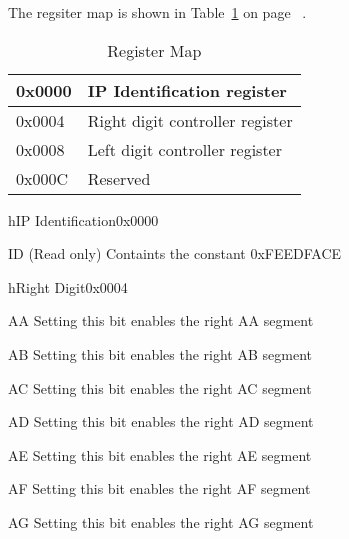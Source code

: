 \documentclass{report}
\begin{document}
The regsiter map is shown in
Table~\ref{table:bar0regmap} on page
~\pageref{table:bar0regmap}.  

\begin{table}[h]
\begin{tabular}{||l|l||}
\hline
 0x0000 & IP Identification register\\
\hline
 0x0004 & Right digit controller register \\
\hline
 0x0008 & Left digit controller register \\
\hline
 0x000C & Reserved \\
\hline
\end{tabular}
\caption{Register Map}
\label{table:bar0regmap}
\end{table}



\begin{register}{h}{IP Identification}{0x0000}%
\label{ID}%
\regnewline%
\begin{regdesc}\begin{reglist}
\item [ID](Read only) Containts the constant 0xFEEDFACE 
\end{reglist}\end{regdesc}\end{register}

\begin{register}{h}{Right Digit}{0x0004}%
\label{RD}%
%
%
%
%
%
%
%
%
\regnewline%
\begin{regdesc}\begin{reglist}
\item [AA]Setting this bit enables the right AA segment
\item [AB]Setting this bit enables the right AB segment
\item [AC]Setting this bit enables the right AC segment
\item [AD]Setting this bit enables the right AD segment
\item [AE]Setting this bit enables the right AE segment
\item [AF]Setting this bit enables the right AF segment
\item [AG]Setting this bit enables the right AG segment
\end{reglist}\end{regdesc}\end{register}
\end{document}
